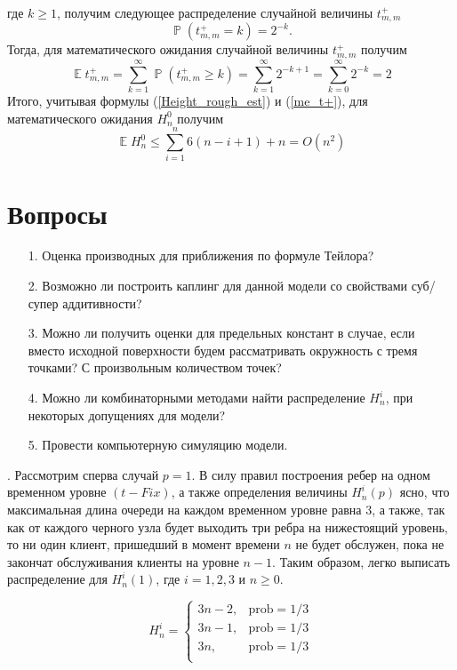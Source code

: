 \documentclass[10pt, reqno]{amsart}
\DeclareMathOperator*{\E}{\mathbb{E}}
\DeclareMathOperator*{\Pb}{\mathbb{P}}
\begin{document}
где $k \geq 1$, получим следующее распределение случайной величины $t^{+}_{m,m}$
\begin{equation*}
    \Pb(t^{+}_{m,m} = k) = 2^{-k}.
\end{equation*}
Тогда, для математического ожидания случайной величины $t^{+}_{m,m}$ получим
\begin{equation}
    \E{}t^{+}_{m,m} = \sum_{k=1}^{\infty}\Pb(t^{+}_{m,m} \geq k) = \sum_{k=1}^{\infty}2^{-k+1} = \sum_{k=0}^{\infty}2^{-k} = 2
    \label{me_t+}
\end{equation}
Итого, учитывая формулы (\ref{Height_rough_est}) и (\ref{me_t+}), для математического ожидания $H^{0}_{n}$ получим
\begin{equation}
    \E{}H^{0}_{n} \leq \sum_{i=1}^{n}6(n-i+1) + n = O(n^{2})
\end{equation}

\section{Вопросы}
\begin{enumerate} 
  \item[1.] Оценка производных для приближения по формуле Тейлора?
  \item[2.] Возможно ли построить каплинг для данной модели со свойствами суб/супер аддитивности?
  \item[3.] Можно ли получить оценки для предельных констант в случае, если вместо исходной поверхности будем рассматривать окружность с тремя точками? С произвольным количеством точек?
  \item[4.] Можно ли комбинаторными методами найти распределение $H_{n}^{i}$, при некоторых допущениях для модели?
  \item[5.] Провести компьютерную симуляцию модели.
\end{enumerate}
. Рассмотрим сперва случай $p=1$. В силу правил построения ребер на одном временном уровне $(t - Fix)$, а также определения величины $H_{n}^{i}(p)$ ясно, что максимальная длина очереди на каждом временном уровне равна $3$, а также, так как от каждого черного узла будет выходить три ребра на нижестоящий уровень, то ни один клиент, пришедший в момент времени $n$ не будет обслужен, пока не закончат обслуживания клиенты на уровне $n-1$. Таким образом, легко выписать распределение для $H_{n}^{i}(1)$, где $i=1,2,3$ и $n \geq 0$.
  
  \begin{equation}
      H_{n}^{i} = \begin{cases}
      3n-2, & \text{prob} = 1/3 \\
      3n-1, & \text{prob} = 1/3 \\
      3n, & \text{prob} = 1/3 \\
      \end{cases}
  \end{equation}
\end{document}
